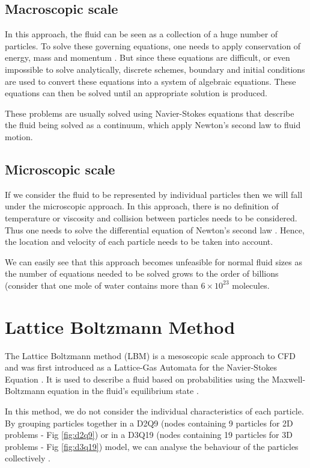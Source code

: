 \documentclass[12pt, openany]{book}
\begin{document}
\subsection{Macroscopic scale}
In this approach, the fluid can be seen as a collection of a huge number of particles. To solve these governing equations, one needs to apply conservation of energy, mass and momentum \cite{lbm_springer}. But since these equations are difficult, or even impossible to solve analytically, discrete schemes, boundary and initial conditions are used to convert these equations into a system of algebraic equations. These equations can then be solved until an appropriate solution is produced. 
\par These problems are usually solved using Navier-Stokes equations that describe the fluid being solved as a continuum, which apply Newton's second law to fluid motion.

\subsection{Microscopic scale}
If we consider the fluid to be represented by individual particles then we will fall under the microscopic approach. In this approach, there is no definition of temperature or viscosity and collision between particles needs to be considered. Thus one needs to solve the differential equation of Newton’s second law \cite{lbm_springer}. Hence, the location and velocity of each particle needs to be taken into account.
	\par We can easily see that this approach becomes unfeasible for normal fluid sizes as the number of equations needed to be solved grows to the order of billions (consider that one mole of water contains more than $6 \times 10^{23}$ molecules.


\section{Lattice Boltzmann Method} \label{sec:lbmLit}
The Lattice Boltzmann method (LBM) is a mesoscopic scale approach to CFD and was first introduced as a Lattice-Gas Automata for the Navier-Stokes Equation \cite{gasautomata}. It is used to describe a fluid based on probabilities using the Maxwell-Boltzmann equation in the fluid’s equilibrium state \cite{lbm_springer}. 
\par In this method, we do not consider the individual characteristics of each particle. By grouping particles together in a D2Q9 (nodes containing 9 particles for 2D problems - Fig \ref{fig:d2q9})  or in a D3Q19 (nodes containing 19 particles for 3D problems - Fig \ref{fig:d3q19}) model, we can analyse the behaviour of the particles collectively  \cite{lbm_springer}. 
\end{document}
